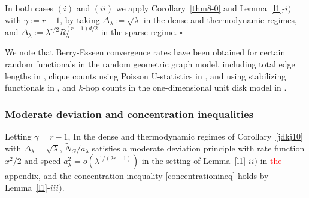 \documentclass[12pt]{article}
\newtheorem{remark}[prop]{Remark}
\newenvironment{Proof}{\removelastskip\par\medskip
\noindent{\em Proof.} \rm}{\penalty-20\null\hfill$\square$\par\medbreak}
\numberwithin{equation}{section}
\begin{document}
\begin{Proof}
  In both cases $(i)$ and $(ii)$ we apply Corollary~\ref{thm8-0} 
  and Lemma~\ref{l1}-$i)$ with $\gamma :=r-1$,
  by taking 
  $\Delta_\lambda:=
  \sqrt{\lambda}$
  in the dense and  thermodynamic regimes,
  and 
  $\Delta_\lambda:= \lambda^{r/2} R_\lambda^{(r-1)d/2}$
  in the sparse regime.
\end{Proof} 
We note that Berry-Esseen convergence rates have been obtained
for certain random functionals in the random geometric graph
model, including total edge lengths in \cite[Corollary~4.3]{schulte},
clique counts using Poisson U-statistics in \cite[Theorem~4.1]{reitzner}, and using stabilizing functionals in \cite[Theorem~3.15]{lachiezerey4},
and $k$-hop counts in the one-dimensional unit disk model in
\cite[Proposition~8.1]{privaultkhops}. 



\subsubsection*{Moderate deviation and concentration inequalities} 
\noindent 
Letting $\gamma =r-1$, 
In the dense and thermodynamic regimes of 
Corollary~\ref{jdkj10} with $\Delta_\lambda=
\sqrt{\lambda}$, $\widetilde{N}_G/a_\lambda$
    satisfies a moderate deviation principle
with rate function $x^2/2$
and speed $a_\lambda^2 = o( \lambda^{1/(2r - 1)} )$
in the setting of Lemma~\ref{l1}-$ii)$ in \textcolor{red}{the} appendix,
and the concentration inequality 
\eqref{concentrationineq} holds by Lemma~\ref{l1}-$iii)$. 
\end{document}
